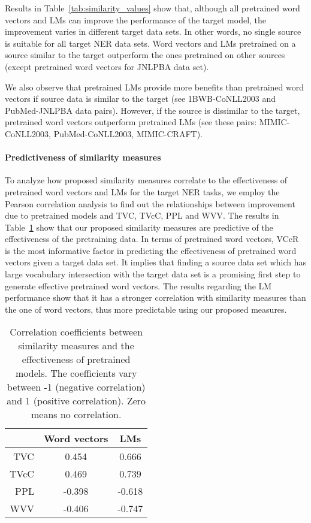 \documentclass[11pt,a4paper]{article}
\begin{document}
Results in Table~\ref{tab:similarity_values} show that, although all pretrained word vectors and LMs can improve the performance of the target model, the improvement varies in different target data sets. 
In other words, no single source is suitable for all target NER data sets. 
Word vectors and LMs pretrained on a source similar to the target outperform the ones pretrained on other sources (except pretrained word vectors for JNLPBA data set). 

We also observe that pretrained LMs provide more benefits than pretrained word vectors if source data is similar to the target (see 1BWB-CoNLL2003 and PubMed-JNLPBA data pairs).
However, if the source is dissimilar to the target, pretrained word vectors outperform pretrained LMs (see these pairs: MIMIC-CoNLL2003, PubMed-CoNLL2003, MIMIC-CRAFT).

\paragraph{Predictiveness of similarity measures}
To analyze how proposed similarity measures correlate to the effectiveness of pretrained word vectors and LMs for the target NER tasks, we employ the Pearson correlation analysis to find out the relationships between improvement due to pretrained models and TVC, TVcC, PPL and WVV. 
The results in Table~\ref{tab:predictiveness} show that our proposed similarity measures are predictive of the effectiveness of the pretraining data. 
In terms of pretrained word vectors, VCcR is the most informative factor in predicting the effectiveness of pretrained word vectors given a target data set. 
It implies that finding a source data set which has large vocabulary intersection with the target data set is a promising first step to generate effective pretrained word vectors. 
The results regarding the LM performance show that it has a stronger correlation with similarity measures than the one of word vectors, thus more predictable using our proposed measures.

\begin{table}[tb]
    \centering
    \begin{small}
    \begin{tabular}{r|c|c}
    \toprule
     & \bf Word vectors & \bf LMs \\ \midrule
     TVC & \phantom{0}0.454 & \phantom{0}0.666 \\
     TVcC & \phantom{0}0.469 & \phantom{0}0.739 \\
     PPL & -0.398 & -0.618 \\
     WVV & -0.406 & -0.747 \\
     \bottomrule
     \end{tabular}
    \caption{\label{tab:predictiveness}Correlation coefficients between similarity measures and the effectiveness of pretrained models. The coefficients vary between -1 (negative correlation) and 1 (positive correlation). Zero means no correlation.}
    \end{small}
\end{table}
\end{document}
